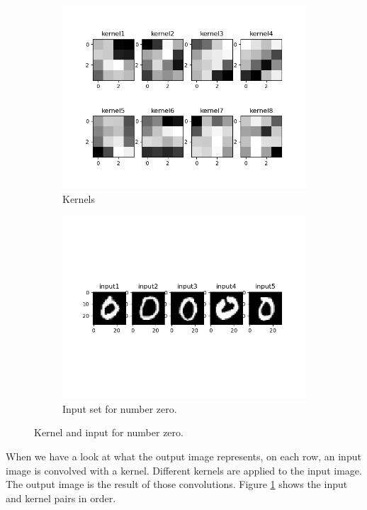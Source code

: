 \documentclass{assignment}
\begin{document}
\begin{figure}[!htb]
    \begin{subfigure}{0.5\textwidth}
        \includegraphics[width=\textwidth]{figures/q2_kernels.png}
        \caption{Kernels}
    \end{subfigure}\hfill
    \begin{subfigure}{0.5\textwidth}
        \includegraphics[width=\textwidth]{figures/q2_zero_input.png}
        \caption{Input set for number zero.}
    \end{subfigure}
    \caption{Kernel and input for number zero.}
    \label{fig:kernel_input}
\end{figure}

\noindent When we have a look at what the output image represents, on each row, an input image is convolved with a kernel. Different kernels are applied to the input image. The output image is the result of those convolutions. Figure \ref{fig:kernel_input} shows the input and kernel pairs in order.
\end{document}
